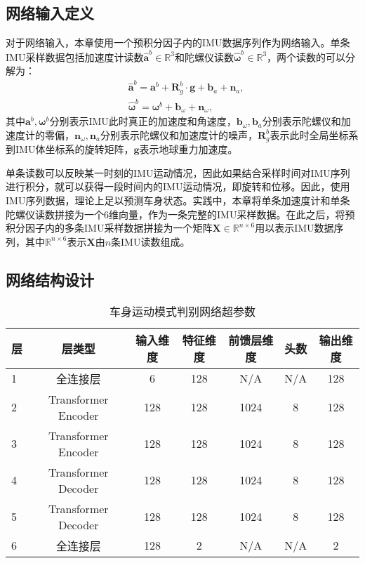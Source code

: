 \subsection{网络输入定义}
对于网络输入，本章使用一个预积分因子内的IMU数据序列作为网络输入。单条IMU采样数据包括加速度计读数$\hat{\symbf{a}}^b \in \mathbb{R}^3$和陀螺仪读数$\hat{\symbf{\omega}}^b \in \mathbb{R}^3$，两个读数的可以分解为：
\begin{equation}
\begin{aligned}
  &\hat{\symbf{a}}^b = \symbf{a}^b + \symbf{R}^{b}_{g}\cdot \symbf{g} + \symbf{b}_{a} + \symbf{n}_{a}, \\
  &\hat{\symbf{\omega}}^b = \symbf{\omega}^b + \symbf{b}_{\omega} + \symbf{n}_{\omega}, 
\end{aligned}
\end{equation}
其中$\symbf{a}^b, \symbf{\omega}^b$分别表示IMU此时真正的加速度和角速度，$\symbf{b}_{\omega}, \symbf{b}_{a}$分别表示陀螺仪和加速度计的零偏，$\symbf{n}_{\omega}, \symbf{n}_{a}$分别表示陀螺仪和加速度计的噪声，$\symbf{R}^{b}_{g}$表示此时全局坐标系到IMU体坐标系的旋转矩阵，$\symbf{g}$表示地球重力加速度。

单条读数可以反映某一时刻的IMU运动情况，因此如果结合采样时间对IMU序列进行积分，就可以获得一段时间内的IMU运动情况，即旋转和位移。因此，使用IMU序列数据，理论上足以预测车身状态。实践中，本章将单条加速度计和单条陀螺仪读数拼接为一个6维向量，作为一条完整的IMU采样数据。在此之后，将预积分因子内的多条IMU采样数据拼接为一个矩阵$\symbf{X}\in \mathbb{R}^{n \times 6}$用以表示IMU数据序列，其中$\mathbb{R}^{n \times 6}$表示$\symbf{X}$由$n$条IMU读数组成。

\subsection{网络结构设计}
\label{sec:network_design}
\begin{table}
  \centering
  \caption{车身运动模式判别网络超参数}
  \begin{tabular}{lcccccc}
  \toprule
  层 & 层类型                 & 输入维度 & 特征维度 & 前馈层维度 & 头数 & 输出维度 \\
  \midrule
  1 & 全连接层                & 6    & 128  & N/A   & N/A & 128 \\
  2 & Transformer Encoder & 128  & 128  & 1024  & 8 & 128  \\
  3 & Transformer Encoder & 128  & 128  & 1024  & 8 & 128  \\
  4 & Transformer Decoder & 128  & 128  & 1024  & 8 & 128  \\
  5 & Transformer Decoder & 128  & 128  & 1024  & 8 & 128  \\
  6 & 全连接层                & 128  & 2    & N/A   & N/A & 2 \\
  \bottomrule
  \end{tabular}
  \label{tab:network}
\end{table}

